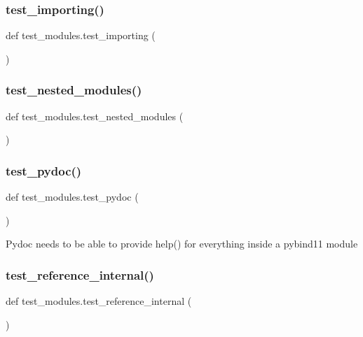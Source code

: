 \subsubsection{\texorpdfstring{test\_importing()}{test\_importing()}}
{\footnotesize\ttfamily def test\+\_\+modules.\+test\+\_\+importing (\begin{DoxyParamCaption}{ }\end{DoxyParamCaption})}

\mbox{\label{namespacetest__modules_a383eb9773420deaa16f493858105f8de}} 
\subsubsection{\texorpdfstring{test\_nested\_modules()}{test\_nested\_modules()}}
{\footnotesize\ttfamily def test\+\_\+modules.\+test\+\_\+nested\+\_\+modules (\begin{DoxyParamCaption}{ }\end{DoxyParamCaption})}

\mbox{\label{namespacetest__modules_aa41222c837d6acd905da2cff357ed0b9}} 
\subsubsection{\texorpdfstring{test\_pydoc()}{test\_pydoc()}}
{\footnotesize\ttfamily def test\+\_\+modules.\+test\+\_\+pydoc (\begin{DoxyParamCaption}{ }\end{DoxyParamCaption})}

\begin{DoxyVerb}Pydoc needs to be able to provide help() for everything inside a pybind11 module\end{DoxyVerb}
 \mbox{\label{namespacetest__modules_a901176e249357eafa5279edba5be65bf}} 
\subsubsection{\texorpdfstring{test\_reference\_internal()}{test\_reference\_internal()}}
{\footnotesize\ttfamily def test\+\_\+modules.\+test\+\_\+reference\+\_\+internal (\begin{DoxyParamCaption}{ }\end{DoxyParamCaption})}

